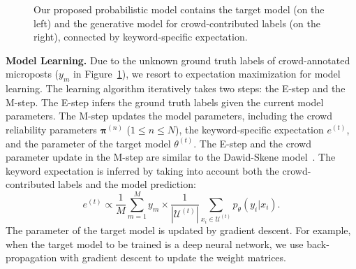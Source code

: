 \documentclass[letterpaper]{article}
\begin{document}
\begin{figure}[t!]
\centering
{}
\caption{Our proposed probabilistic model contains the target model (on the left) and the generative model for crowd-contributed labels (on the right), connected by keyword-specific expectation.}
\label{fig:model}
\end{figure}

\smallskip
\noindent\textbf{Model Learning.} Due to the unknown ground truth labels of crowd-annotated microposts ($y_m$ in Figure~\ref{fig:model}), we resort to expectation maximization for model learning. The learning algorithm iteratively takes two steps: the E-step and the M-step. The E-step infers the ground truth labels given the current model parameters. The M-step updates the model parameters, including the crowd reliability parameters $\boldsymbol{\pi}^{(n)}$ ($1\leq n\leq N$), the keyword-specific expectation $e^{(t)}$, and the parameter of the target model $\theta^{(t)}$. The E-step and the crowd parameter update in the M-step are similar to the Dawid-Skene model~\cite{dawid1979maximum}. The keyword expectation is inferred by taking into account both the crowd-contributed labels and the model prediction:
\begin{equation}
    e^{(t)} \propto  \frac{1}{M}\sum_{m=1}^M y_m \times \frac{1}{|\mathcal{U}^{(t)}|} \sum_{x_i\in \mathcal{U}^{(t)}} p_\theta(y_i|x_i).%
\end{equation}
The parameter of the target model is updated by gradient descent. For example, when the target model to be trained is a deep neural network, we use back-propagation with gradient descent to update the weight matrices.
\end{document}
